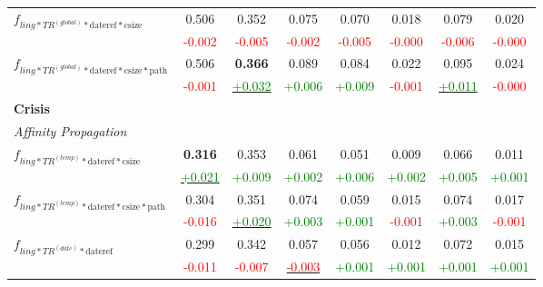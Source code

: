 \documentclass[a4paper,BCOR=10mm]{report}
\numberwithin{lemma}{chapter}
\numberwithin{definition}{chapter}
\begin{document}
\begin{table}
\begin{tabular}{|l|c|cc|cc|cc|}
\multirow{2}{*}{$f_{ling*TR^{(global)}*\text{dateref}*\text{csize}}$}   & 0.506 & 0.352 & 0.075 & 0.070 & 0.018 & 0.079 & 0.020 \\
    & \small \textcolor{red}{-0.002}    & \small \textcolor{red}{-0.005}    & \small \textcolor{red}{-0.002}    & \small \textcolor{red}{-0.005}    & \small \textcolor{red}{-0.000}    & \small \textcolor{red}{-0.006}    & \small \textcolor{red}{-0.000} \\\hline
\multirow{2}{*}{$f_{ling*TR^{(global)}*\text{dateref}*\text{csize}*\text{path}}$}   & 0.506 & \textbf{0.366}    & 0.089 & 0.084 & 0.022 & 0.095 & 0.024 \\
    & \small \textcolor{red}{-0.001}    & \underline{\small \textcolor{green}{+0.032}}  & \small \textcolor{green}{+0.006}  & \small \textcolor{green}{+0.009}  & \small \textcolor{red}{-0.001}    & \underline{\small \textcolor{green}{+0.011}}  & \small \textcolor{red}{-0.000} \\\hline
\multicolumn{8}{|l|}{ \textbf{Crisis} }\\\hline
\multicolumn{8}{|l|}{ \textit{Affinity Propagation} }\\\hline
\multirow{2}{*}{$f_{ling*TR^{(temp)}*\text{dateref}*\text{csize}}$} & \textbf{0.316}    & 0.353 & 0.061 & 0.051 & 0.009 & 0.066 & 0.011 \\
    & \underline{\small \textcolor{green}{+0.021}}  & \small \textcolor{green}{+0.009}  & \small \textcolor{green}{+0.002}  & \small \textcolor{green}{+0.006}  & \small \textcolor{green}{+0.002}  & \small \textcolor{green}{+0.005}  & \small \textcolor{green}{+0.001} \\\hline
\multirow{2}{*}{$f_{ling*TR^{(temp)}*\text{dateref}*\text{csize}*\text{path}}$} & 0.304 & 0.351 & 0.074 & 0.059 & 0.015 & 0.074 & 0.017 \\
    & \small \textcolor{red}{-0.016}    & \underline{\small \textcolor{green}{+0.020}}  & \small \textcolor{green}{+0.003}  & \small \textcolor{green}{+0.001}  & \small \textcolor{red}{-0.001}    & \small \textcolor{green}{+0.003}  & \small \textcolor{red}{-0.001} \\\hline
\multirow{2}{*}{$f_{ling*TR^{(date)}*\text{dateref}}$}  & 0.299 & 0.342 & 0.057 & 0.056 & 0.012 & 0.072 & 0.015 \\
    & \small \textcolor{red}{-0.011}    & \small \textcolor{red}{-0.007}    & \underline{\small \textcolor{red}{-0.003}}    & \small \textcolor{green}{+0.001}  & \small \textcolor{green}{+0.001}  & \small \textcolor{green}{+0.001}  & \small \textcolor{green}{+0.001} \\\hline

\end{tabular}
\end{table}
\end{document}
